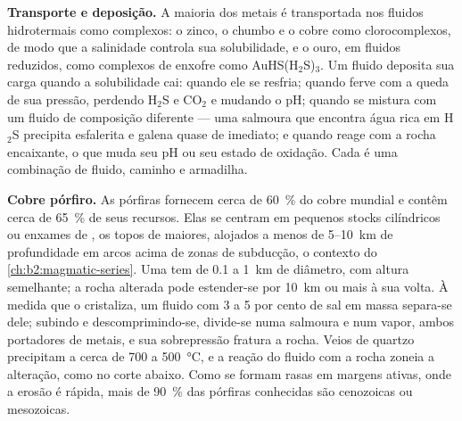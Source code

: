 \textbf{Transporte e deposição.} A maioria dos metais é transportada nos fluidos hidrotermais como complexos:
o zinco, o chumbo e o cobre como clorocomplexos, de modo que a salinidade controla sua solubilidade, e o ouro,
em fluidos reduzidos, como complexos de enxofre como AuHS(H$_2$S)$_3$. Um fluido deposita sua carga quando a
solubilidade cai: quando ele se resfria; quando ferve com a queda de sua pressão, perdendo H$_2$S e CO$_2$ e
mudando o pH; quando se mistura com um fluido de composição diferente --- uma salmoura que encontra água rica
em H$_2$S precipita esfalerita e galena quase de imediato; e quando reage com a rocha
encaixante, o que muda seu pH ou seu estado de oxidação. Cada  é uma combinação de fluido,
caminho e armadilha.

\textbf{Cobre pórfiro.} As  pórfiras fornecem cerca de \qty{60}{\percent} do cobre
mundial e contêm cerca de \qty{65}{\percent} de seus recursos. Elas se centram em pequenos stocks
cilíndricos ou enxames de , os topos de  maiores, alojados a menos de 5--\qty{10}{km} de profundidade em
arcos acima de zonas de subducção, o contexto do \cref{ch:b2:magmatic-series}. Uma  tem de 0.1 a
\qty{1}{km} de diâmetro, com altura semelhante; a rocha alterada pode estender-se por \qty{10}{km} ou mais à sua volta.
À medida que o  cristaliza, um fluido com 3 a 5 por cento de sal em massa separa-se dele; subindo e
descomprimindo-se, divide-se numa salmoura e num vapor, ambos portadores de metais, e sua sobrepressão
fratura a rocha. Veios de quartzo precipitam a cerca de 700 a \qty{500}{\celsius}, e a
reação do fluido com a rocha zoneia a alteração, como no corte abaixo. Como se
formam rasas em margens ativas, onde a erosão é rápida, mais de \qty{90}{\percent} das  pórfiras
conhecidas são cenozoicas ou mesozoicas.

